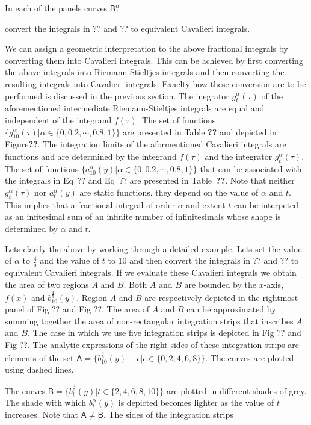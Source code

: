 \documentclass{article}
\theoremstyle{theorem}
\theoremstyle{definition}
\begin{document}
In each of the panels  curves $\mathsf{B}_1^{\alpha}$

convert the 
integrals in ?? and ?? to equivalent Cavalieri integrals.


We can assign a geometric interpretation to the above fractional integrals by converting them into Cavalieri integrals. This can be achieved by first 
converting the above integrals into Riemann-Stieltjes integrals and then converting the resulting integrals into Cavalieri integrals. Exaclty how these conversion are 
to be performed is discussed in the previous section. The inegrator $g_t^{\alpha}(\tau)$ of the aforementioned intermediate Riemann-Stieltjes integrals are equal and independent of the integrand $f(\tau)$.
The set of functions $\{g_{10}^{\alpha}(\tau)|\alpha\in\{0,0.2,\cdots,0.8,1\}\}$ are presented in Table \textbf{??} and depicted in Figure\textbf{??}. The integration limits of the aformentioned Cavalieri 
integrals are functions and are determined by the integrand $f(\tau)$ and the integrator $g_t^{\alpha}(\tau)$. The set of functions $\{a_{10}^{\alpha}(y)|\alpha\in\{0,0.2,\cdots,0.8,1\}\}$ that can be 
associated with the integrals in Eq~{??} and Eq~{??} are presented in Table~\textbf{??}. Note that neither $g_t^{\alpha}(\tau)$ nor $a_t^{\alpha}(y)$ are static functions, 
they depend on the value of $\alpha$ and $t$. This implies that a fractional integral of order $\alpha$ and extent $t$ can be interpeted as an infitesimal sum of an infinite number of infinitesimals whose 
shape is determined by $\alpha$ and $t$.

Lets clarify the above by working through a detailed example. Lets set the value of $\alpha$ to $\frac{4}{5}$ and the value of $t$ to 10 and then convert the 
integrals in ?? and ?? to equivalent Cavalieri integrals. If we evaluate these Cavalieri integrals we obtain the area of two regions $A$ and $B$. Both $A$ and $B$ are bounded by the $x$-axis, 
$f(x)$ and $b_{10}^{\frac{4}{5}}(y)$. Region $A$ and $B$ are respectively depicted in the rightmost panel of Fig ?? and Fig ??. The area of $A$ and $B$ can be approximated
by summing together the area of non-rectangular integration strips that inscribes $A$ and $B$. The case in which we use five integration strips is depicted in 
Fig ?? and Fig ??. The analytic expressions of the right sides of these integration strips are elements of the set $\mathsf{A} = \{b_{10}^{\frac{4}{5}}(y) - c|c\in\{0,2,4,6,8\}\}$. The 
curves are plotted using dashed lines. 

The curves $\mathsf{B} = \{b_{t}^{\frac{4}{5}}(y)|t\in\{2,4,6,8,10\}\}$ are plotted in different shades of grey. The shade with which $b_t^{\alpha}(y)$ is depicted becomes lighter as the value of $t$ increases. Note 
that $\mathsf{A}\neq \mathsf{B}$. The sides of the integration strips 
\end{document}
